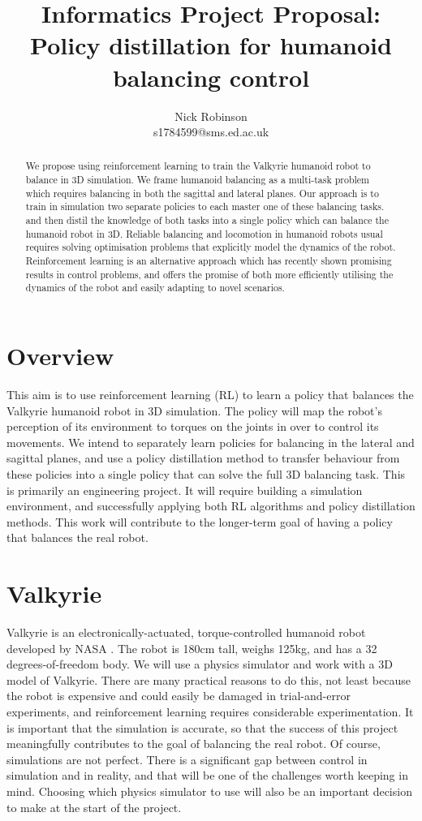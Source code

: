 \documentclass[a4paper]{article}
\title{Informatics Project Proposal:\\Policy distillation for humanoid balancing control}
\author{Nick Robinson\\s1784599@sms.ed.ac.uk}
\date{}
\begin{document}
\maketitle


\begin{abstract}
We propose using reinforcement learning to train the Valkyrie humanoid robot to balance in 3D simulation. 
We frame humanoid balancing as a multi-task problem which requires balancing in both the sagittal and lateral planes. 
Our approach is to train in simulation two separate policies to each master one of these balancing tasks. and then distil the knowledge of both tasks into a single policy which can balance the humanoid robot in 3D. 
Reliable balancing and locomotion in humanoid robots usual requires solving optimisation problems that explicitly model the dynamics of the robot. 
Reinforcement learning is an alternative approach which has recently shown promising results in control problems,
and offers the promise of both more efficiently utilising the dynamics of the robot and easily adapting to novel scenarios.
\end{abstract}


\section{Overview}

This aim is to use reinforcement learning (RL) to learn a policy that balances the Valkyrie humanoid robot in 3D simulation. The policy will map the robot’s perception of its environment to torques on the joints in over to control its movements.
We intend to separately learn policies for balancing in the lateral and sagittal planes, and use a policy distillation method to transfer behaviour from these policies into a single policy that can solve the full 3D balancing task. This is primarily an engineering project.  It will require building a simulation environment, and successfully applying both RL algorithms and policy distillation methods. This work will contribute to the longer-term goal of having a policy that balances the real robot. 

\section{Valkyrie}
Valkyrie is an electronically-actuated, torque-controlled humanoid robot developed by NASA \citep{radford2015valkyrie}. The robot is 180cm tall, weighs 125kg, and has a 32 degrees-of-freedom body. We will use a physics simulator and work with a 3D model of Valkyrie. There are many practical reasons to do this, not least because the robot is expensive and could easily be damaged in trial-and-error experiments, and reinforcement learning requires considerable experimentation. It is important that the simulation is accurate, so that the success of this project meaningfully contributes to the goal of balancing the real robot. Of course, simulations are not perfect. There is a significant gap between control in simulation and in reality, and that will be one of the challenges worth keeping in mind. Choosing which physics simulator to use will also be an important decision to make at the start of the project. 
\end{document}
